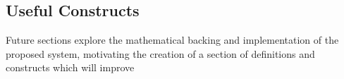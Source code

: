 \subsection{Useful Constructs}

Future sections explore the mathematical backing and implementation of the proposed system, motivating the creation of a section of definitions and constructs which will improve 